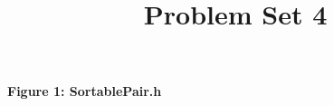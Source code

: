 \documentclass[12pt, letterpaper]{article}
\title{Problem Set 4}
\author{}
\date{}
\newcommand{\includeminted}[3]
{
  \begin{center}
  \textbf{#1}
  \vspace{-5pt}
  \inputminted[linenos, breaklines]{#2}{#3}
  \end{center}
}
\begin{document}
\normalsize
\includeminted{Figure 1: SortablePair.h}{cpp}{../src/List.h}
\end{document}
